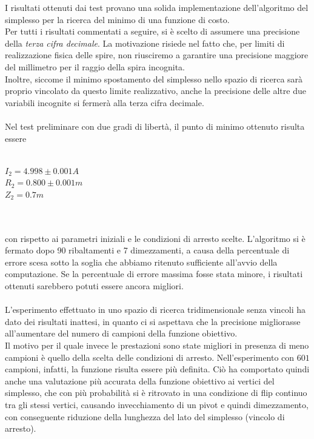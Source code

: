 \documentclass[a4paper, 11pt]{article}
\begin{document}
I risultati ottenuti dai test provano una solida implementazione dell'algoritmo
del simplesso per la ricerca del minimo di una funzione di costo. \\
Per tutti i risultati commentati a seguire, si è scelto di assumere una
precisione della \emph{terza cifra decimale}. La motivazione risiede nel
fatto che, per limiti di realizzazione fisica delle spire, non riusciremo a
garantire una precisione maggiore del millimetro per il raggio della spira
incognita. \\ 
Inoltre, siccome il minimo spostamento del simplesso nello spazio di ricerca
sarà proprio vincolato da questo limite realizzativo, anche la precisione delle
altre due variabili incognite si fermerà alla terza cifra decimale. \\ \\
Nel test preliminare con due gradi di libertà, il punto di minimo ottenuto
risulta essere \\ \\
\centerline{ $I_{2} = 4.998 \pm 0.001 A$ \\ $R_{2} = 0.800 \pm 0.001m$ \\ $Z_{2}
= 0.7m$} \\ \\
con rispetto ai parametri iniziali e le condizioni di arresto scelte.
L'algoritmo si è fermato dopo 90 ribaltamenti e 7 dimezzamenti, a causa della
percentuale di errore scesa sotto la soglia che abbiamo ritenuto sufficiente
all'avvio della computazione. Se la percentuale di errore massima fosse stata
minore, i risultati ottenuti sarebbero potuti essere ancora migliori. \\
\\
L'esperimento effettuato in uno spazio di ricerca tridimensionale senza vincoli
ha dato dei risultati inattesi, in quanto ci si aspettava che la precisione
migliorasse all'aumentare del numero di campioni della funzione obiettivo. \\
Il motivo per il quale invece le prestazioni sono state migliori in presenza di
meno campioni è quello della scelta delle condizioni di arresto.
Nell'esperimento con $601$ campioni, infatti, la funzione risulta essere più
definita. Ciò ha comportato quindi anche una valutazione più accurata della
funzione obiettivo ai vertici del simplesso, che con più probabilità si è
ritrovato in una condizione di flip continuo tra gli stessi vertici, causando
invecchiamento di un pivot e quindi dimezzamento, con conseguente riduzione
della lunghezza del lato del simplesso (vincolo di arresto). \\
\end{document}
